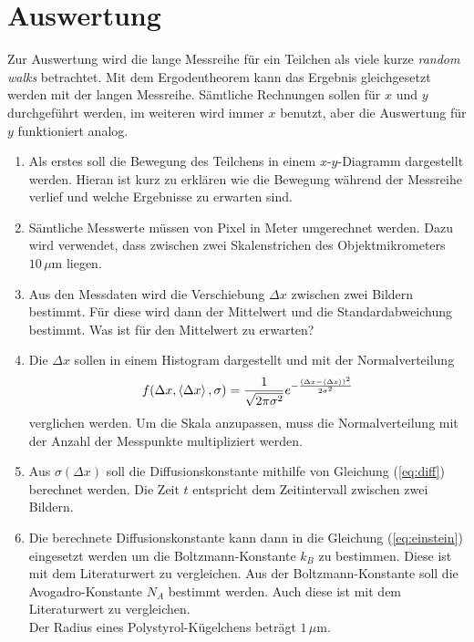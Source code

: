 \section*{Auswertung}

Zur Auswertung wird die lange Messreihe für ein Teilchen als viele kurze \emph{random walks} betrachtet. Mit dem Ergodentheorem kann das Ergebnis gleichgesetzt werden mit der langen Messreihe.
Sämtliche Rechnungen sollen für $x$ und $y$ durchgeführt werden, im weiteren wird immer $x$ benutzt, aber die Auswertung für $y$ funktioniert analog.

\begin{enumerate}
\item Als erstes soll die Bewegung des Teilchens in einem $x$-$y$-Diagramm dargestellt werden. Hieran ist kurz zu erklären wie die Bewegung während der Messreihe verlief und welche Ergebnisse zu erwarten sind.

\item Sämtliche Messwerte müssen von Pixel in Meter umgerechnet werden. Dazu wird verwendet, dass zwischen zwei Skalenstrichen des Objektmikrometers $10\, \mu$m liegen.

\item Aus den Messdaten wird die Verschiebung $\Delta x$ zwischen zwei Bildern bestimmt. Für diese wird dann der Mittelwert und die Standardabweichung bestimmt. Was ist für den Mittelwert zu erwarten?

\item Die $\Delta x$ sollen in einem Histogram dargestellt und mit der Normalverteilung
\begin{equation}
  f(\Delta x, \left< \Delta x \right>, \sigma) = \frac{1}{\sqrt{2 \pi \sigma^2}} e^{- \frac{(\Delta x - \left< \Delta x \right>)^2}{2 \sigma^2}}
\end{equation}
verglichen werden. Um die Skala anzupassen, muss die Normalverteilung mit der Anzahl der Messpunkte multipliziert werden.

\item Aus $\sigma(\Delta x)$ soll die Diffusionskonstante mithilfe von Gleichung (\ref{eq:diff}) berechnet werden. Die Zeit $t$ entspricht dem Zeitintervall zwischen zwei Bildern.

\item Die berechnete Diffusionskonstante kann dann in die Gleichung (\ref{eq:einstein}) eingesetzt werden um die Boltzmann-Konstante $k_B$ zu bestimmen. Diese ist mit dem Literaturwert zu vergleichen. Aus der Boltzmann-Konstante soll die Avogadro-Konstante $N_A$ bestimmt werden. Auch diese ist mit dem Literaturwert zu vergleichen.\\
Der Radius eines Polystyrol-Kügelchens beträgt $1\,\mu$m.
\end{enumerate}


